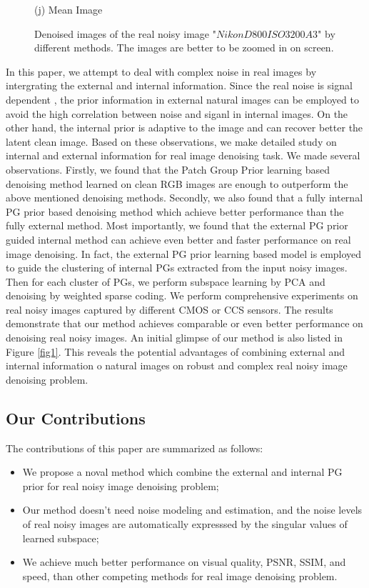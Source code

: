 \documentclass[10pt,twocolumn,letterpaper]{article}
\begin{document}
\begin{figure}
{\begin{minipage}[t]{0.195\textwidth}
{\footnotesize (j) Mean Image }
\end{minipage}
}
\caption{Denoised images of the real noisy image "$Nikon D800 ISO 3200 A3$" by different methods. The images are better to be zoomed in on screen.}
\end{figure} 

In this paper, we attempt to deal with complex noise in real images by intergrating the external and internal information. Since the real noise is signal dependent \cite{crosschannel2016,healey1994radiometric}, the prior information in external natural images can be employed to avoid the high correlation between noise and siganl in internal images. On the other hand, the internal prior is adaptive to the image and can recover better the latent clean image. Based on these observations, we make detailed study on internal and external information for real image denoising task. We made several observations. Firstly, we found that the Patch Group Prior learning based denoising method \cite{pgpd} learned on clean RGB images are enough to outperform the above mentioned denoising methods. Secondly, we also found that a fully internal PG prior based denoising method which achieve better performance than the fully external method. Most importantly, we found that the external PG prior guided internal method can achieve even better and faster performance on real image denoising. In fact, the external PG prior learning based model is employed to guide the clustering of internal PGs extracted from the input noisy images. Then for each cluster of PGs, we perform subspace learning by PCA and denoising by weighted sparse coding. We perform comprehensive experiments on real noisy images captured by different CMOS or CCS sensors. The results demonstrate that our method achieves comparable or even better performance on denoising real noisy images. An initial glimpse of our method is also listed in Figure \ref{fig1}. This reveals the potential advantages of combining external and internal information o natural images on robust and complex real noisy image denoising problem.

\subsection{Our Contributions}
The contributions of this paper are summarized as follows:
\begin{itemize}
\item We propose a noval method which combine the external and internal PG prior for real noisy image denoising problem;
\item Our method doesn't need noise modeling and estimation, and the noise levels of real noisy images are automatically expresssed by the singular values of learned subspace;
\item We achieve much better performance on visual quality, PSNR, SSIM, and speed, than other competing methods for real image denoising problem.
\end{itemize}
\end{document}

